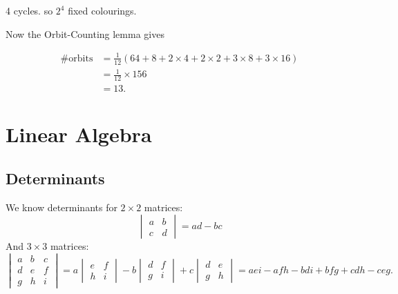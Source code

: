 \documentclass{article}
\theoremstyle{definition} \newtheorem*{definition}{Definition}
\begin{document}
\begin{exmps}
\begin{itemize}
       \begin{figure}[h] 
         \centering 

         \label{fig:necklace1} \end{figure}
       

       4 cycles. so $2^4$ fixed colourings.

       
       Now the Orbit-Counting lemma gives

       \begin{align*} \# \text{orbits} &= \frac{1}{12}(64 + 8 + 2\times4 +
         2\times 2 + 3 \times 8 + 3 \times 16)\\ &= \frac{1}{12}\times 156 \\
         &= 13.  \end{align*} \end{itemize} \end{exmps}

\section{Linear Algebra} \subsection{Determinants} We know determinants for $2
\times 2$ matrices: \[ \begin{vmatrix} a & b \\ c & d \end{vmatrix} = ad - bc
\] And $3 \times 3$ matrices: \[ \begin{vmatrix} a & b & c \\ d & e & f \\ g &
    h & i \end{vmatrix} = a \begin{vmatrix} e & f \\ h & i \end{vmatrix} -
b\begin{vmatrix} d & f \\ g & i \end{vmatrix} + c\begin{vmatrix} d & e \\ g & h
\end{vmatrix} = aei - afh - bdi +bfg +cdh-ceg.  \]
\end{document}
